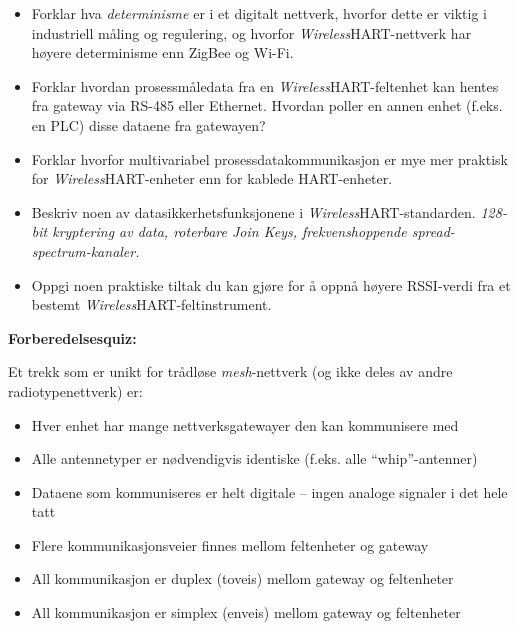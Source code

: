 \begin{itemize}
\item{} Forklar hva \textit{determinisme} er i et digitalt nettverk, hvorfor dette er viktig i industriell måling og regulering, og hvorfor {\sl Wireless}HART-nettverk har høyere determinisme enn ZigBee og Wi-Fi.
\item{} Forklar hvordan prosessmåledata fra en {\sl Wireless}HART-feltenhet kan hentes fra gateway via RS-485 eller Ethernet. Hvordan poller en annen enhet (f.eks. en PLC) disse dataene fra gatewayen?
\item{} Forklar hvorfor multivariabel prosessdatakommunikasjon er mye mer praktisk for {\sl Wireless}HART-enheter enn for kablede HART-enheter.
\item{} Beskriv noen av datasikkerhetsfunksjonene i {\sl Wireless}HART-standarden. \textit{128-bit kryptering av data, roterbare Join Keys, frekvenshoppende spread-spectrum-kanaler.}
\item{} Oppgi noen praktiske tiltak du kan gjøre for å oppnå høyere RSSI-verdi fra et bestemt {\sl Wireless}HART-feltinstrument.
\end{itemize}









\vfil \eject

\noindent
{\bf Forberedelsesquiz:}

Et trekk som er unikt for trådløse \textit{mesh}-nettverk (og ikke deles av andre radiotypenettverk) er:

\begin{itemize}
\item{} Hver enhet har mange nettverksgatewayer den kan kommunisere med
\vskip 5pt 
\item{} Alle antennetyper er nødvendigvis identiske (f.eks. alle ``whip''-antenner)
\vskip 5pt 
\item{} Dataene som kommuniseres er helt digitale -- ingen analoge signaler i det hele tatt
\vskip 5pt 
\item{} Flere kommunikasjonsveier finnes mellom feltenheter og gateway
\vskip 5pt 
\item{} All kommunikasjon er duplex (toveis) mellom gateway og feltenheter 
\vskip 5pt 
\item{} All kommunikasjon er simplex (enveis) mellom gateway og feltenheter
\end{itemize}




\vfil \eject

